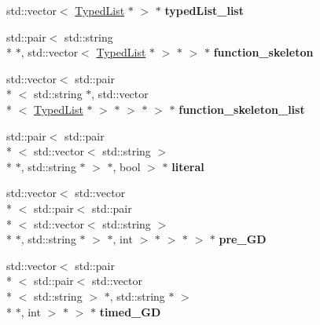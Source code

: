 \begin{DoxyCompactItemize}
\item 
\hypertarget{unionParserBase_1_1STYPE_____a931331d6fc1c63176aface5775f7973d}{std\+::vector$<$ \hyperlink{classTypedList}{Typed\+List} $\ast$ $>$ $\ast$ {\bfseries typed\+List\+\_\+list}}\label{unionParserBase_1_1STYPE_____a931331d6fc1c63176aface5775f7973d}

\item 
\hypertarget{unionParserBase_1_1STYPE_____ae6657530c88b67602d9c3d152c9e08bb}{std\+::pair$<$ std\+::string \\*
$\ast$, std\+::vector$<$ \hyperlink{classTypedList}{Typed\+List} $\ast$ $>$ $\ast$ $>$ $\ast$ {\bfseries function\+\_\+skeleton}}\label{unionParserBase_1_1STYPE_____ae6657530c88b67602d9c3d152c9e08bb}

\item 
\hypertarget{unionParserBase_1_1STYPE_____ac3322fdc19571ded0354accbb53384cb}{std\+::vector$<$ std\+::pair\\*
$<$ std\+::string $\ast$, std\+::vector\\*
$<$ \hyperlink{classTypedList}{Typed\+List} $\ast$ $>$ $\ast$ $>$ $\ast$ $>$ $\ast$ {\bfseries function\+\_\+skeleton\+\_\+list}}\label{unionParserBase_1_1STYPE_____ac3322fdc19571ded0354accbb53384cb}

\item 
\hypertarget{unionParserBase_1_1STYPE_____a70c36b4ca4cb9695e912495b0a276b63}{std\+::pair$<$ std\+::pair\\*
$<$ std\+::vector$<$ std\+::string $>$\\*
 $\ast$, std\+::string $\ast$ $>$ $\ast$, bool $>$ $\ast$ {\bfseries literal}}\label{unionParserBase_1_1STYPE_____a70c36b4ca4cb9695e912495b0a276b63}

\item 
\hypertarget{unionParserBase_1_1STYPE_____a4b65f160ac88f1f44a1e9c4a892b3612}{std\+::vector$<$ std\+::vector\\*
$<$ std\+::pair$<$ std\+::pair\\*
$<$ std\+::vector$<$ std\+::string $>$\\*
 $\ast$, std\+::string $\ast$ $>$ $\ast$, int $>$ $\ast$ $>$ $\ast$ $>$ $\ast$ {\bfseries pre\+\_\+\+G\+D}}\label{unionParserBase_1_1STYPE_____a4b65f160ac88f1f44a1e9c4a892b3612}

\item 
\hypertarget{unionParserBase_1_1STYPE_____adf129a6213d541035b873cff52d26e63}{std\+::vector$<$ std\+::pair\\*
$<$ std\+::pair$<$ std\+::vector\\*
$<$ std\+::string $>$ $\ast$, std\+::string $\ast$ $>$\\*
 $\ast$, int $>$ $\ast$ $>$ $\ast$ {\bfseries timed\+\_\+\+G\+D}}\label{unionParserBase_1_1STYPE_____adf129a6213d541035b873cff52d26e63}


\end{DoxyCompactItemize}
